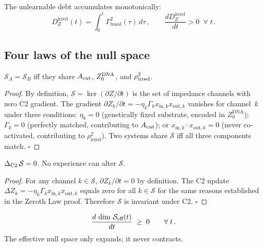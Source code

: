 \documentclass[aps,pre,twocolumn,superscriptaddress,floatfix]{revtex4-2}
\begin{document}
The unlearnable debt accumulates monotonically:
\begin{equation}
  D_Z^{\text{irred}}(t)
    = \int_0^t \Gamma_{\text{basal}}^2(\tau)\,d\tau\,,
  \qquad
  \frac{d D_Z^{\text{irred}}}{dt} > 0
  \;\;\forall\;t\,.
  \label{eq:irreducible-debt}
\end{equation}

\subsection{Four laws of the null space}
\label{sec:four-laws}

\begin{theorem}
\label{thm:zeroth-law}
$\mathcal{S}_A = \mathcal{S}_B$ iff they share
$A_{\text{cut}}$, $Z_0^{\textnormal{DNA}}$, and
$\rho_{\textnormal{irred}}^2$.
\end{theorem}

\begin{proof}
By definition, $\mathcal{S} = \ker(\partial Z/\partial t)$
is the set of impedance channels with zero C2 gradient.
The gradient $\partial Z_k/\partial t = -\eta_k \Gamma_k
x_{\text{in},k} x_{\text{out},k}$ vanishes for channel~$k$
under three conditions: $\eta_k = 0$ (genetically fixed
substrate, encoded in $Z_0^{\text{DNA}}$);
$\Gamma_k = 0$ (perfectly matched, contributing to
$A_{\text{cut}}$); or $x_{\text{in},k} \cdot x_{\text{out},k} = 0$
(never co-activated, contributing to $\rho_{\text{irred}}^2$).
Two systems share $\mathcal{S}$ iff all three
components match. $\square$
\end{proof}

\begin{theorem}
\label{thm:first-law}
$\Delta_{\textnormal{C2}}\,\mathcal{S} = 0$.
No experience can alter $\mathcal{S}$.
\end{theorem}

\begin{proof}
For any channel $k \in \mathcal{S}$,
$\partial Z_k/\partial t = 0$ by definition.
The C2 update $\Delta Z_k = -\eta_k \Gamma_k
x_{\text{in},k} x_{\text{out},k}$ equals zero
for all $k \in \mathcal{S}$ for the same reasons
established in the Zeroth Law proof.
Therefore $\mathcal{S}$ is invariant under C2. $\square$
\end{proof}

\begin{theorem}
\label{thm:second-law}
\begin{equation}
  \frac{d\,\dim\,\mathcal{S}_{\textnormal{eff}}(t)}{dt}
  \;\ge\; 0
  \qquad \forall\;t\,.
  \label{eq:second-law}
\end{equation}
The effective null space only expands; it never contracts.
\end{theorem}
\end{document}
